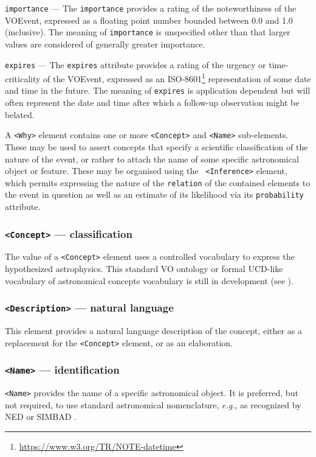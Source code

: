 \documentclass[11pt,a4paper]{ivoa}
\begin{document}
 \texttt{importance}\label{sec:3.6.1} ---
The \texttt{importance} provides a rating of the noteworthiness of the VOEvent, 
expressed as a floating point number bounded between 0.0 and 1.0 (inclusive). 
The meaning of \texttt{importance} is unspecified other than that larger values are
considered of generally greater importance. 

 \texttt{expires}\label{sec:3.6.2} --- 
The \texttt{expires} attribute provides a rating of the urgency or time-criticality
of the VOEvent, expressed as an ISO-8601\footnote{\url{
https://www.w3.org/TR/NOTE-datetime}} representation of some date and time in 
the future. The meaning of \texttt{expires} is application dependent but will often
represent the date and time after which a follow-up observation might be 
belated. 

A \texttt{<Why>} element contains one or more \texttt{<Concept>} and \texttt{<Name>} 
sub-elements. These may be used to assert concepts that specify a scientific 
classification of the nature of the event, or rather to attach the name of some 
specific astronomical object or feature. These may be organised using the \texttt{
<Inference>} element, which permits expressing the nature of the \texttt{relation} 
of the contained elements to the event in question as well as an estimate of its 
likelihood via its \texttt{probability} attribute. 

\setcounter{subsubsection}{2} 
\subsubsection{\texttt{<Concept>} --- classification}\label{sec:3.6.3}
The value of a \texttt{<Concept>} element uses a controlled vocabulary to express 
the hypothesized astrophysics. This standard VO ontology or formal UCD-like 
vocabulary of astronomical concepts vocabulary is still in development (see 
\citep{2018ivoa.spec.0527P}).

\subsubsection{\texttt{<Description>} --- natural language}\label{sec:3.6.4}
This element provides a natural language description of the concept, either as 
a replacement for the \texttt{<Concept>} element, or as an elaboration. 

\subsubsection{\texttt{<Name>} --- identification}\label{sec:3.6.5}
\texttt{<Name>} provides the name of a specific astronomical object. It is 
preferred, but not required, to use standard astronomical nomenclature, 
\emph{e.g.}, as recognized by NED \citep{bib22} or SIMBAD \citep{bib23}. 
\end{document}
